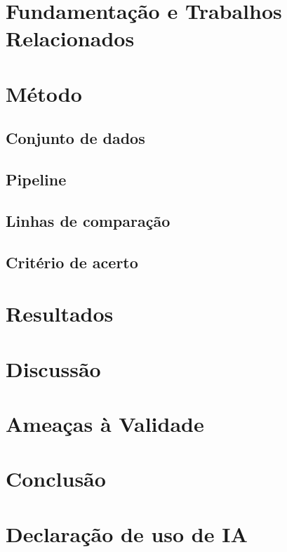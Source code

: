 \documentclass[conference]{IEEEtran}
\begin{document}
\section{Fundamentação e Trabalhos Relacionados}

\section{Método}
\subsection{Conjunto de dados}
\subsection{Pipeline}
\subsection{Linhas de comparação}
\subsection{Critério de acerto}

\section{Resultados}

\section{Discussão}

\section{Ameaças à Validade}

\section{Conclusão}

\section*{Declaração de uso de IA}


% 
\end{document}
